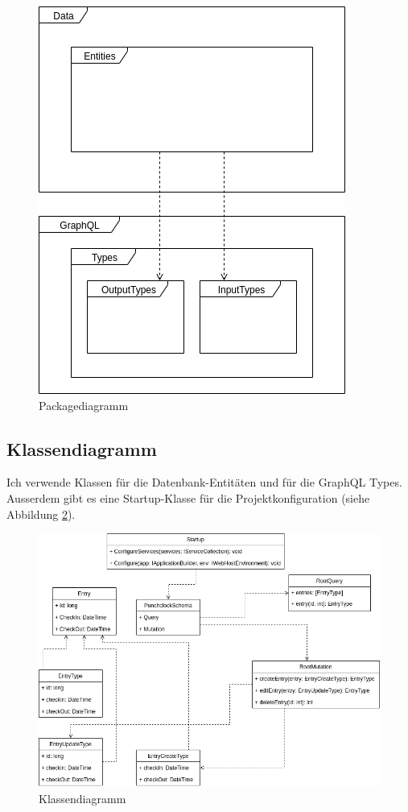 \documentclass[a4paper, titlepage]{article}
\begin{document}
    \begin{figure}
        \includegraphics[width=\textwidth]{images/Packagediagramm.png}
        \caption{Packagediagramm}
        \label{packages}
    \end{figure}
    
    \subsection{Klassendiagramm}
    Ich verwende Klassen für die Datenbank-Entitäten und für die
    GraphQL Types. Ausserdem gibt es eine Startup-Klasse für die 
    Projektkonfiguration (siehe Abbildung \ref{classdiagram}).

    \begin{figure}
        \includegraphics[width=\textwidth]{images/Klassendiagramm.png}
        \caption{Klassendiagramm}
        \label{classdiagram}
    \end{figure}
\end{document}

